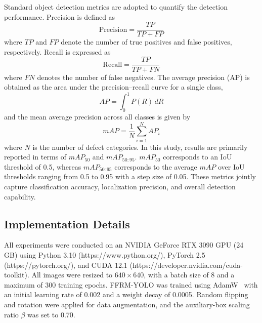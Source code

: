 \documentclass[pdflatex,sn-nature]{sn-jnl}
\begin{document}
Standard object detection metrics are adopted to quantify the detection performance. Precision is defined as
\begin{equation}
    \mathrm{Precision} = \frac{TP}{TP + FP}
\end{equation}
where $TP$ and $FP$ denote the number of true positives and false positives, respectively. Recall is expressed as
\begin{equation}
    \mathrm{Recall} = \frac{TP}{TP + FN}
\end{equation}
where $FN$ denotes the number of false negatives. The average precision (AP) is obtained as the area under the precision--recall curve for a single class,
\begin{equation}
    AP = \int_{0}^{1} P(R)\, dR
\end{equation}
and the mean average precision across all classes is given by
\begin{equation}
    mAP = \frac{1}{N} \sum_{i=1}^{N} AP_i
\end{equation}
where $N$ is the number of defect categories. In this study, results are primarily reported in terms of $mAP_{50}$ and $mAP_{50:95}$. $mAP_{50}$ corresponds to an IoU threshold of 0.5, whereas $mAP_{50:95}$ corresponds to the average $mAP$ over IoU thresholds ranging from 0.5 to 0.95 with a step size of 0.05. These metrics jointly capture classification accuracy, localization precision, and overall detection capability.


\subsection{Implementation Details}
\label{subsec:implementation}

All experiments were conducted on an NVIDIA GeForce RTX 3090 GPU
(24 GB) using Python 3.10 (https://www.python.org/),
PyTorch 2.5 (https://pytorch.org/), and CUDA 12.1
(https://developer.nvidia.com/cuda-toolkit).
All images were resized to $640 \times 640$, with a batch size
of 8 and a maximum of 300 training epochs.
FFRM-YOLO was trained using AdamW~\cite{Loshchilov2019AdamW}
with an initial learning rate of 0.002 and a weight decay
of 0.0005. Random flipping and rotation were applied for data
augmentation, and the auxiliary-box scaling ratio $\beta$
was set to 0.70.
\end{document}
